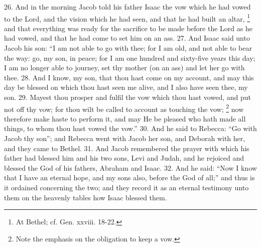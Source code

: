26. And in the morning Jacob told his father Isaac the vow which he had vowed to the Lord, and the vision which he had seen, and that he had built an altar, \footnote{At Bethel; cf. Gen. xxviii. 18-22.} and that everything was ready for the sacrifice to be made before the Lord as he had vowed, and that he had come to set him on an ass. 27. And Isaac said unto Jacob his son: ``I am not able to go with thee; for I am old, and not able to bear the way: go, my son, in peace; for I am one hundred and sixty-five years this day; I am no longer able to journey, set thy mother (on an ass) and let her go with thee. 28. And I know, my son, that thou hast come on my account, and may this day be blessed on which thou hast seen me alive, and I also have seen thee, my son. 29. Mayest thou prosper and fulfil the vow which thou hast vowed, and put not off thy vow; for thou wilt be called to account as touching the vow; \footnote{Note the emphasis on the obligation to keep a vow.} now therefore make haste to perform it, and may He be pleased who hath made all things, to whom thou hast vowed the vow.'' 30. And he said to Rebecca: ``Go with Jacob thy son''; and Rebecca went with Jacob her son, and Deborah with her, and they came to Bethel. 31. And Jacob remembered the prayer with which his father had blessed him and his two sons, Levi and Judah, and he rejoiced and blessed the God of his fathers, Abraham and Isaac. 32. And he said: ``Now I know that I have an eternal hope, and my sons also, before the God of all;'' and thus is it ordained concerning the two; and they record it as an eternal testimony unto them on the heavenly tables how Isaac blessed them.



